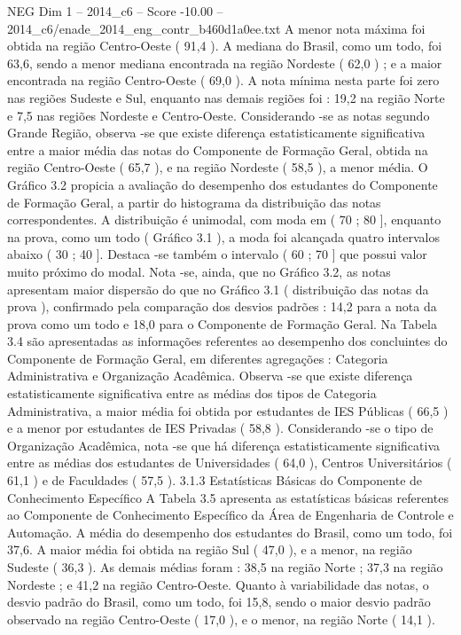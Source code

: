 \begin{textsample}{NEG Dim 1 – 2014\_c6 – Score -10.00 – 2014\_c6/enade\_2014\_eng\_contr\_b460d1a0ee.txt}
A menor nota máxima foi obtida na região Centro-Oeste ( 91,4 ).
A mediana do Brasil, como um todo, foi 63,6, sendo a menor mediana encontrada na região Nordeste ( 62,0 ) ; e a maior encontrada na região Centro-Oeste ( 69,0 ).
A nota mínima nesta parte foi zero nas regiões Sudeste e Sul, enquanto nas demais regiões foi : 19,2 na região Norte e 7,5 nas regiões Nordeste e Centro-Oeste.
Considerando -se as notas segundo Grande Região, observa -se que existe diferença estatisticamente significativa entre a maior média das notas do Componente de Formação Geral, obtida na região Centro-Oeste ( 65,7 ), e na região Nordeste ( 58,5 ), a menor média.
O Gráfico 3.2 propicia a avaliação do desempenho dos estudantes do Componente de Formação Geral, a partir do histograma da distribuição das notas correspondentes.
A distribuição é unimodal, com moda em ( 70 ; 80 ], enquanto na prova, como um todo ( Gráfico 3.1 ), a moda foi alcançada quatro intervalos abaixo ( 30 ; 40 ].
Destaca -se também o intervalo ( 60 ; 70 ] que possui valor muito próximo do modal.
Nota -se, ainda, que no Gráfico 3.2, as notas apresentam maior dispersão do que no Gráfico 3.1 ( distribuição das notas da prova ), confirmado pela comparação dos desvios padrões : 14,2 para a nota da prova como um todo e 18,0 para o Componente de Formação Geral.
Na Tabela 3.4 são apresentadas as informações referentes ao desempenho dos concluintes do Componente de Formação Geral, em diferentes agregações : Categoria Administrativa e Organização Acadêmica.
Observa -se que existe diferença estatisticamente significativa entre as médias dos tipos de Categoria Administrativa, a maior média foi obtida por estudantes de IES Públicas ( 66,5 ) e a menor por estudantes de IES Privadas ( 58,8 ).
Considerando -se o tipo de Organização Acadêmica, nota -se que há diferença estatisticamente significativa entre as médias dos estudantes de Universidades ( 64,0 ), Centros Universitários ( 61,1 ) e de Faculdades ( 57,5 ). 3.1.3 Estatísticas Básicas do Componente de Conhecimento Específico A Tabela 3.5 apresenta as estatísticas básicas referentes ao Componente de Conhecimento Específico da Área de Engenharia de Controle e Automação.
A média do desempenho dos estudantes do Brasil, como um todo, foi 37,6.
A maior média foi obtida na região Sul ( 47,0 ), e a menor, na região Sudeste ( 36,3 ).
As demais médias foram : 38,5 na região Norte ; 37,3 na região Nordeste ; e 41,2 na região Centro-Oeste.
Quanto à variabilidade das notas, o desvio padrão do Brasil, como um todo, foi 15,8, sendo o maior desvio padrão observado na região Centro-Oeste ( 17,0 ), e o menor, na região Norte ( 14,1 ).

\end{textsample}
